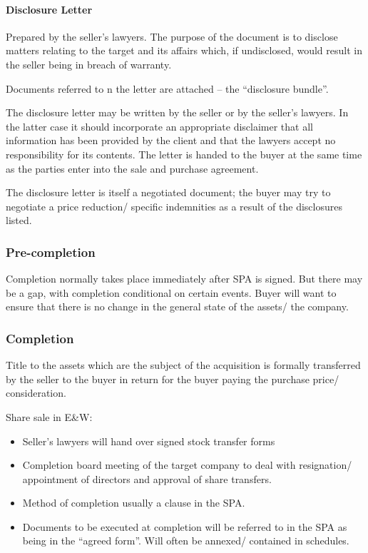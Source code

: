 \documentclass[
]{article}
\providecommand{\tightlist}{%
  \setlength{\itemsep}{0pt}\setlength{\parskip}{0pt}}
\begin{document}
\hypertarget{disclosure-letter}{%
\paragraph{Disclosure Letter}\label{disclosure-letter}}

Prepared by the seller's lawyers. The purpose of the document is to
disclose matters relating to the target and its affairs which, if
undisclosed, would result in the seller being in breach of warranty.

Documents referred to n the letter are attached -- the ``disclosure
bundle''.

The disclosure letter may be written by the seller or by the seller's
lawyers. In the latter case it should incorporate an appropriate
disclaimer that all information has been provided by the client and that
the lawyers accept no responsibility for its contents. The letter is
handed to the buyer at the same time as the parties enter into the sale
and purchase agreement.

The disclosure letter is itself a negotiated document; the buyer may try
to negotiate a price reduction/ specific indemnities as a result of the
disclosures listed.

\hypertarget{pre-completion}{%
\subsubsection{Pre-completion}\label{pre-completion}}

Completion normally takes place immediately after SPA is signed. But
there may be a gap, with completion conditional on certain events. Buyer
will want to ensure that there is no change in the general state of the
assets/ the company.

\hypertarget{completion}{%
\subsubsection{Completion}\label{completion}}

Title to the assets which are the subject of the acquisition is formally
transferred by the seller to the buyer in return for the buyer paying
the purchase price/ consideration.

Share sale in E\&W:

\begin{itemize}
\tightlist
\item
  Seller's lawyers will hand over signed stock transfer forms
\item
  Completion board meeting of the target company to deal with
  resignation/ appointment of directors and approval of share transfers.
\item
  Method of completion usually a clause in the SPA.
\item
  Documents to be executed at completion will be referred to in the SPA
  as being in the ``agreed form''. Will often be annexed/ contained in
  schedules.
\end{itemize}
\end{document}
